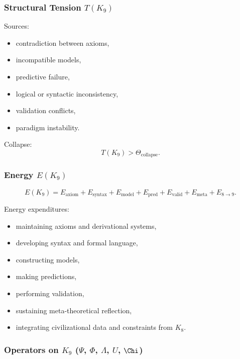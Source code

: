 \subsubsection{Structural Tension \texorpdfstring{$T(K_9)$}{T(K_9)}}

Sources:
\begin{itemize}
    \item contradiction between axioms,
    \item incompatible models,
    \item predictive failure,
    \item logical or syntactic inconsistency,
    \item validation conflicts,
    \item paradigm instability.
\end{itemize}

Collapse:
\[
T(K_9) > \Theta_{\mathrm{collapse}}.
\]

\subsubsection{Energy \texorpdfstring{$E(K_9)$}{E(K_9)}}

\[
E(K_9)=
E_{\mathrm{axiom}}+
E_{\mathrm{syntax}}+
E_{\mathrm{model}}+
E_{\mathrm{pred}}+
E_{\mathrm{valid}}+
E_{\mathrm{meta}}+
E_{8\to9}.
\]

Energy expenditures:
\begin{itemize}
    \item maintaining axioms and derivational systems,
    \item developing syntax and formal language,
    \item constructing models,
    \item making predictions,
    \item performing validation,
    \item sustaining meta-theoretical reflection,
    \item integrating civilizational data and constraints from $K_8$.
\end{itemize}

\subsubsection{Operators on \texorpdfstring{$K_9$}{K_9} (\texorpdfstring{$\Psi$}{\Psi}, \texorpdfstring{$\Phi$}{\Phi}, \texorpdfstring{$\Lambda$}{\Lambda}, \texorpdfstring{$U$}{U}, \texorpdfstring{$\Chi$}{\Chi})}

